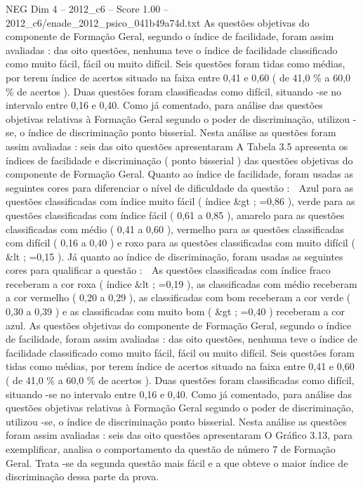 \begin{textsample}{NEG Dim 4 – 2012\_c6 – Score 1.00 – 2012\_c6/enade\_2012\_psico\_041b49a74d.txt}
As questões objetivas do componente de Formação Geral, segundo o índice de facilidade, foram assim avaliadas : das oito questões, nenhuma teve o índice de facilidade classificado como muito fácil, fácil ou muito difícil.
Seis questões foram tidas como médias, por terem índice de acertos situado na faixa entre 0,41 e 0,60 ( de 41,0 \% a 60,0 \% de acertos ).
Duas questões foram classificadas como difícil, situando -se no intervalo entre 0,16 e 0,40.
Como já comentado, para análise das questões objetivas relativas à Formação Geral segundo o poder de discriminação, utilizou -se, o índice de discriminação ponto bisserial.
Nesta análise as questões foram assim avaliadas : seis das oito questões apresentaram A Tabela 3.5 apresenta os índices de facilidade e discriminação ( ponto bisserial ) das questões objetivas do componente de Formação Geral.
Quanto ao índice de facilidade, foram usadas as seguintes cores para diferenciar o nível de dificuldade da questão :  Azul para as questões classificadas com índice muito fácil ( índice \&gt ; =0,86 ), verde para as questões classificadas com índice fácil ( 0,61 a 0,85 ), amarelo para as questões classificadas com médio ( 0,41 a 0,60 ), vermelho para as questões classificadas com difícil ( 0,16 a 0,40 ) e roxo para as questões classificadas com muito difícil ( \&lt ; =0,15 ).
Já quanto ao índice de discriminação, foram usadas as seguintes cores para qualificar a questão :  As questões classificadas com índice fraco receberam a cor roxa ( índice \&lt ; =0,19 ), as classificadas com médio receberam a cor vermelho ( 0,20 a 0,29 ), as classificadas com bom receberam a cor verde ( 0,30 a 0,39 ) e as classificadas com muito bom ( \&gt ; =0,40 ) receberam a cor azul.
As questões objetivas do componente de Formação Geral, segundo o índice de facilidade, foram assim avaliadas : das oito questões, nenhuma teve o índice de facilidade classificado como muito fácil, fácil ou muito difícil.
Seis questões foram tidas como médias, por terem índice de acertos situado na faixa entre 0,41 e 0,60 ( de 41,0 \% a 60,0 \% de acertos ).
Duas questões foram classificadas como difícil, situando -se no intervalo entre 0,16 e 0,40.
Como já comentado, para análise das questões objetivas relativas à Formação Geral segundo o poder de discriminação, utilizou -se, o índice de discriminação ponto bisserial.
Nesta análise as questões foram assim avaliadas : seis das oito questões apresentaram O Gráfico 3.13, para exemplificar, analisa o comportamento da questão de número 7 de Formação Geral.
Trata -se da segunda questão mais fácil e a que obteve o maior índice de discriminação dessa parte da prova.

\end{textsample}
